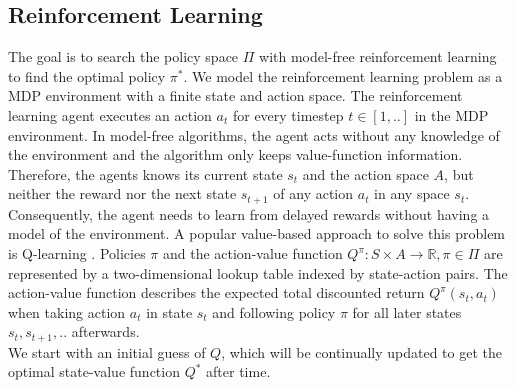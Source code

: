 \subsection{Reinforcement Learning}
\label{reinforcement}
The goal is to search the policy space $\Pi$ with model-free reinforcement learning \cite{strehl09} to find the optimal policy $\pi^*$. We model the reinforcement learning problem as a MDP environment with a finite state and action space. The reinforcement learning agent executes an action $a_t$ for every timestep $t \in [1,..]$ in the MDP environment. In model-free algorithms, the agent acts without any knowledge of the environment and the algorithm only keeps value-function information. Therefore, the agents knows its current state $s_t$ and the action space $A$, but neither the reward nor the next state $s_{t+1}$ of any action $a_t$ in any space $s_t$.\\
Consequently, the agent needs to learn from delayed rewards without having a model of the environment. A popular value-based approach to solve this problem is Q-learning \cite{peng04}. Policies $\pi$ and the action-value function $Q^{\pi} : S \times A \rightarrow \mathbb{R},\pi \in \Pi$ are represented by a two-dimensional lookup table indexed by state-action pairs. The action-value function describes the expected total discounted return $Q^{\pi}(s_t,a_t)$ when taking action $a_t$ in state $s_t$ and following policy $\pi$ for all later states $s_t, s_{t+1},..$ afterwards.\\
We start with an initial guess of $Q$, which will be continually updated to get the optimal state-value function $Q^*$ after time.


